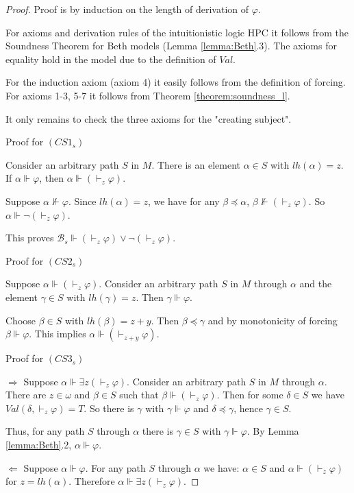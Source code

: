 \documentclass{asl}
\theoremstyle{definition}
\begin{document}
\begin{proof}
Proof is by induction on the length of derivation of $ \varphi $. 

For axioms and derivation rules of the intuitionistic logic HPC it follows from the Soundness Theorem for Beth models (Lemma \ref{lemma:Beth}.3). The axioms for equality hold in the model due to the definition of $ Val$. 

For the induction axiom (axiom 4) it easily follows from the definition of forcing. For axioms 1-3, 5-7 it follows from Theorem \ref{theorem:soundness_l}. 

It only remains to check the three axioms for the "creating subject".

\begin{center}
Proof for $ (CS1_s) $
\end{center}

Consider an arbitrary path $ S $ in $ M $. There is an element $\alpha\in S$ with $ lh(\alpha)=z$. If $\alpha \Vdash \varphi $, then $\alpha \Vdash \left(\vdash_z \varphi \right)$.

Suppose $\alpha \nVdash \varphi $. Since 
$ lh(\alpha)=z $, we have for any $ \beta\preccurlyeq\alpha $,  $\beta \nVdash \left(\vdash_z \varphi \right) $. So $\alpha\Vdash\neg \left(\vdash_z \varphi \right) $. 

This proves $ \mathcal{B}_s \Vdash \left(\vdash_z \varphi \right)\vee \neg \left(\vdash_z \varphi \right)$.

\begin{center}
Proof for $ (CS2_s) $
\end{center}

Suppose $\alpha \Vdash \left(\vdash_z \varphi \right)$. Consider an arbitrary path $S$ in $M$ through $\alpha$ and the element $ \gamma\in S$ with $lh(\gamma)=z$. Then $\gamma\Vdash\varphi$. 

Choose $ \beta\in S $ with $ lh(\beta)=z+y$. Then $\beta\preccurlyeq\gamma $ and by monotonicity of forcing $\beta\Vdash\varphi $. This implies $\alpha \Vdash \left(\vdash_{z+y} \varphi \right)$.

\begin{center}
Proof for $ (CS3_s)$
\end{center}

$ \Rightarrow $ Suppose $\alpha \Vdash \exists z\left(\vdash_z \varphi \right)$. 
Consider an arbitrary path $S$ in $M$ through $\alpha$. There are $z\in\omega$ and $\beta\in S$ such that $\beta \Vdash \left(\vdash_z \varphi \right)$. Then for some $\delta\in S$ we have $Val(\delta,\vdash_z\varphi)=T$. So there is $\gamma$ with $\gamma\Vdash\varphi$ and $\delta\preceq\gamma$, hence $\gamma\in S$.

Thus, for any path $S$ through $\alpha$ there is $\gamma\in S$ with $\gamma\Vdash\varphi$. By Lemma \ref{lemma:Beth}.2, $\alpha\Vdash\varphi$.

$ \Leftarrow $ Suppose $\alpha\Vdash\varphi$. For any path $S$ through $\alpha$ we have: $\alpha\in S$ and $\alpha \Vdash \left(\vdash_z \varphi \right)$ for $z=lh(\alpha)$. Therefore $\alpha \Vdash \exists z\left(\vdash_z \varphi \right)$.
\end{proof}
\end{document}
